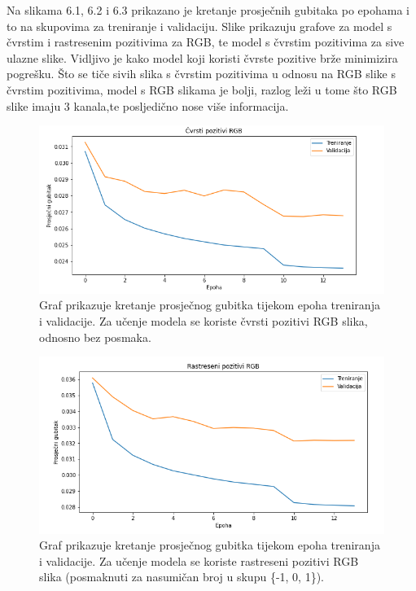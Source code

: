 \documentclass[times, utf8, zavrsni, numeric]{fer}
\begin{document}
Na slikama 6.1, 6.2 i 6.3 prikazano je kretanje prosječnih gubitaka po epohama i to na skupovima za treniranje i validaciju. Slike prikazuju grafove za model s čvrstim i rastresenim pozitivima za RGB, te model s čvrstim  pozitivima za sive ulazne slike. Vidljivo je kako model koji koristi čvrste pozitive brže minimizira pogrešku. Što se tiče sivih slika s čvrstim pozitivima u odnosu na RGB slike s čvrstim pozitivima,  model s RGB slikama je bolji, razlog leži u tome što RGB slike imaju 3 kanala,te posljedično nose više informacija.
\begin{figure}[htb]
\centering
\includegraphics[scale = 0.44]{img/HARDPOS_RGB.png}
\caption{Graf prikazuje kretanje prosječnog gubitka tijekom epoha treniranja i validacije. Za učenje modela se koriste čvrsti pozitivi RGB slika, odnosno bez posmaka.}
\label{fig:KITTI}
\end{figure}
\begin{figure}[htb]
\centering
\includegraphics[scale = 0.44]{img/LOOSE_RGB.png}
\caption{Graf prikazuje kretanje prosječnog gubitka tijekom epoha treniranja i validacije. Za učenje modela se koriste rastreseni pozitivi RGB slika (posmaknuti za nasumičan broj u skupu \{-1, 0, 1\}).}
\label{fig:KITTI}
\end{figure}
\end{document}
